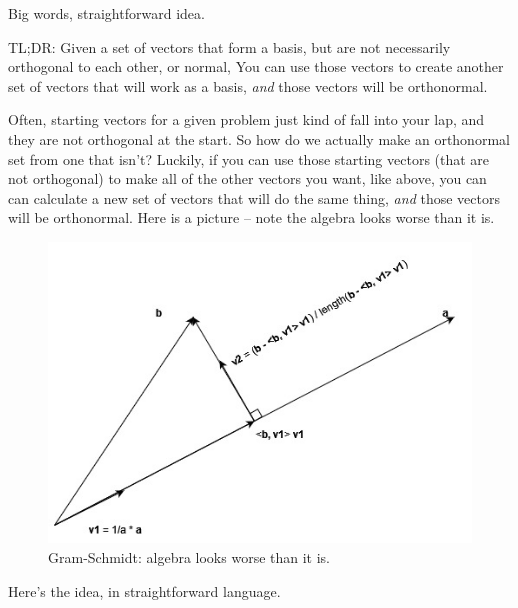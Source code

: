 \documentclass[
]{book}
\begin{document}
Big words, straightforward idea.

TL;DR: Given a set of vectors that form a basis, but are not necessarily orthogonal to each other, or normal, You can use those vectors to create another set of vectors that will work as a basis, \emph{and} those vectors will be orthonormal.

Often, starting vectors for a given problem just kind of fall into your lap, and they are not orthogonal at the start. So how do we actually make an orthonormal set from one that isn't? Luckily, if you can use those starting vectors (that are not orthogonal) to make all of the other vectors you want, like above, you can can calculate a new set of vectors that will do the same thing, \emph{and} those vectors will be orthonormal. Here is a picture -- note the algebra looks worse than it is.

\begin{figure}

{\centering \includegraphics[width=0.75\linewidth,height=0.75\textheight]{images/gram-schmidt} 

}

\caption{Gram-Schmidt: algebra looks worse than it is.}\label{fig:unnamed-chunk-5}
\end{figure}

Here's the idea, in straightforward language.
\end{document}
